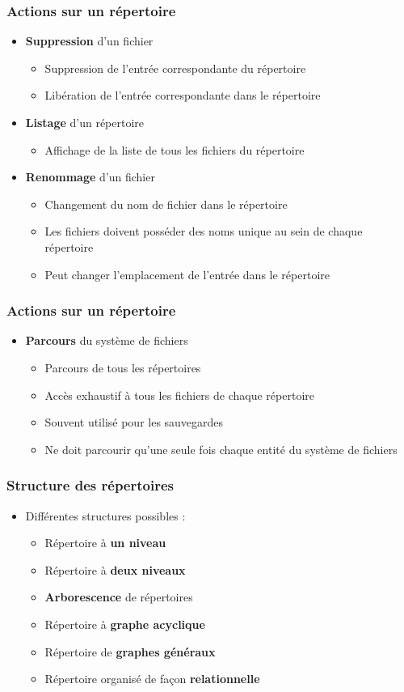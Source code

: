 \begin{frame}
\frametitle{Actions sur un répertoire}
\begin{itemize}
\item \textbf{Suppression} d'un fichier
\begin{itemize}
\item Suppression de l'entrée correspondante du répertoire
\item Libération de l'entrée correspondante dans le répertoire
\end{itemize}
\item \textbf{Listage} d'un répertoire
\begin{itemize}
\item Affichage de la liste de tous les fichiers du répertoire
\end{itemize}
\item \textbf{Renommage} d'un fichier
\begin{itemize}
\item Changement du nom de fichier dans le répertoire
\item Les fichiers doivent posséder des noms unique au sein de chaque répertoire
\item Peut changer l'emplacement de l'entrée dans le répertoire
\end{itemize}
\end{itemize}
\end{frame}

\begin{frame}
\frametitle{Actions sur un répertoire}
\begin{itemize}
\item \textbf{Parcours} du système de fichiers
\begin{itemize}
\item Parcours de tous les répertoires
\item Accès exhaustif à tous les fichiers de chaque répertoire
\item Souvent utilisé pour les sauvegardes
\item  Ne doit parcourir qu'une seule fois chaque entité du système de fichiers
\end{itemize}
\end{itemize}
\end{frame}

\begin{frame}
\frametitle{Structure des répertoires}
\begin{itemize}
\item Différentes structures possibles :
\begin{itemize}
\item Répertoire à \textbf{un niveau}
\item Répertoire à \textbf{deux niveaux}
\item \textbf{Arborescence} de répertoires
\item Répertoire à \textbf{graphe acyclique}
\item Répertoire de \textbf{graphes généraux}
\item Répertoire organisé de façon \textbf{relationnelle}
\end{itemize}
\end{itemize}
\end{frame}

